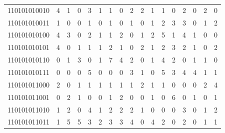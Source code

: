 \documentclass[10pt,a4paper]{article}
\begin{document}
\begin{longtable}{ |c|c|c|c|c|c|c|c|c|c|c|c|c|c|c|c|c| }
    110101010010              & 4                            & 1                                & 0                            & 3                              & 1   & 1   & 0   & 2   & 2   & 1   & 1   & 0   & 2   & 0   & 2   & 0   \\
    110101010011              & 1                            & 0                                & 0                            & 1                              & 0   & 1   & 0   & 1   & 0   & 1   & 2   & 3   & 3   & 0   & 1   & 2   \\
    110101010100              & 4                            & 3                                & 0                            & 2                              & 1   & 1   & 2   & 0   & 1   & 2   & 5   & 1   & 4   & 1   & 0   & 0   \\
    110101010101              & 4                            & 0                                & 1                            & 1                              & 1   & 2   & 1   & 0   & 2   & 1   & 2   & 3   & 2   & 1   & 0   & 2   \\
    110101010110              & 0                            & 1                                & 3                            & 0                              & 1   & 7   & 4   & 2   & 0   & 1   & 4   & 2   & 0   & 1   & 1   & 0   \\
    110101010111              & 0                            & 0                                & 0                            & 5                              & 0   & 0   & 0   & 3   & 1   & 0   & 5   & 3   & 4   & 4   & 1   & 1   \\
    110101011000              & 2                            & 0                                & 1                            & 1                              & 1   & 1   & 1   & 1   & 2   & 1   & 1   & 0   & 0   & 0   & 2   & 4   \\
    110101011001              & 0                            & 2                                & 1                            & 0                              & 0   & 1   & 2   & 0   & 0   & 1   & 0   & 6   & 0   & 1   & 0   & 1   \\
    110101011010              & 1                            & 2                                & 0                            & 4                              & 1   & 2   & 2   & 2   & 1   & 0   & 0   & 0   & 3   & 0   & 1   & 2   \\
    110101011011              & 1                            & 5                                & 5                            & 3                              & 2   & 3   & 3   & 4   & 0   & 4   & 2   & 0   & 2   & 0   & 1   & 1   \\

\end{longtable}
\end{document}
